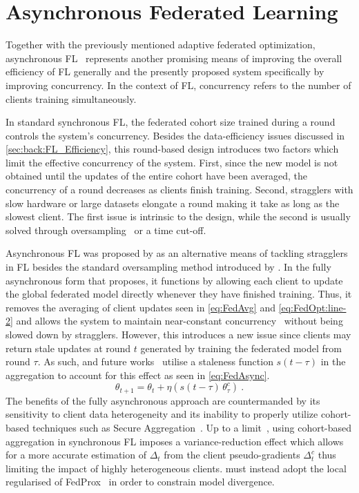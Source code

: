 \section{Asynchronous Federated Learning}
Together with the previously mentioned adaptive federated optimization, asynchronous FL~\citep{AsyncFedOpt,FedBuff,PAPAYA,AsynchronousFLonHetDevicesSurvey,AsyncrhonousOnlineFL} represents another promising means of improving the overall efficiency of FL generally and the presently proposed system specifically by improving concurrency. In the context of FL, concurrency refers to the number of clients training simultaneously.

In standard synchronous FL, the federated cohort size trained during a round controls the system's concurrency. Besides the data-efficiency issues discussed in \cref{sec:back:FL_Efficiency}, this round-based design introduces two factors which limit the effective concurrency of the system. First, since the new model is not obtained until the updates of the entire cohort have been averaged, the concurrency of a round decreases as clients finish training. Second, stragglers with slow hardware or large datasets elongate a round making it take as long as the slowest client. The first issue is intrinsic to the design, while the second is usually solved through oversampling~\citep{ScaleSystemDesign} or a time cut-off.

Asynchronous FL was proposed by \citet{AsyncFedOpt} as an alternative means of tackling stragglers in FL besides the standard oversampling method introduced by \citet{ScaleSystemDesign}. In the fully asynchronous form that \citet{AsyncFedOpt} proposes, it functions by allowing each client to update the global federated model directly whenever they have finished training. Thus, it removes the averaging of client updates seen in \cref{eq:FedAvg} and \cref{eq:FedOpt:line-2} and allows the system to maintain near-constant concurrency~\citep{FedBuff,PAPAYA} without being slowed down by stragglers. However, this introduces a new issue since clients may return stale updates at round $t$ generated by training the federated model from round $\tau$. As such, \citet{AsyncFedOpt} and future works~\citep{FedBuff,PAPAYA} utilise a staleness function $s(t-\tau)$ in the aggregation to account for this effect as seen in \cref{eq:FedAsync}.
\begin{equation} \label{eq:FedAsync}
    \theta_{t+1} = \theta_t + \eta  \left( s(t-\tau)\, \theta_{\tau}^c \right) \ .
\end{equation}
The benefits of the fully asynchronous approach are countermanded by its sensitivity to client data heterogeneity and its inability to properly utilize cohort-based techniques such as Secure Aggregation~\citep{SecAggOG}. Up to a limit~\citep{LargeCohorts,FedBuff,PAPAYA}, using cohort-based aggregation in synchronous FL imposes a variance-reduction effect which allows for a more accurate estimation of $\Delta_t$ from the client pseudo-gradients $\Delta_t^c$ thus limiting the impact of highly heterogeneous clients. \citet{AsyncFedOpt} must instead adopt the local regularised of FedProx~\citep{FedProx} in order to constrain model divergence.

